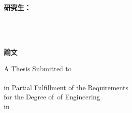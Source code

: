 
\begin{titlepage}
\linespread{1} \edukai
\vspace*{1mm}

\begin{center}

{\LARGE\bfseries  \titletw}\\
\vspace{15mm}
{\LARGE  \titleen}
\vspace{15mm}

{ \large\bfseries {研究生：} \large\authortwname \\
     \large\supervisortwname \\
    \makebox [25mm][l]{ \large\bfseries { }} 
    \ifdefempty{\cosupervisortwname}{}{\large\cosupervisortwname } }

\vspace{7mm}
{\Large\bfseries{\schooltwname}\\
\vspace{4.5mm}
\Large\bfseries{}\\
\vspace{4.5mm}
\Large\bfseries \degreetw 論文}\\
\vspace{10mm}

\vspace{4.5mm}
A Thesis Submitted to \deptenname\\
\schoolenname\\
in Partial Fulfillment of the Requirements\\
for the Degree of \degreeen \,of Engineering\\
in \majortwname

\vspace{15mm}
\dateen\\
\schoolenlocation


\vspace{10mm}
\fontsize{14pt}{0pt}{\bfseries{\dateROC }}

\end{center}

\end{titlepage} 